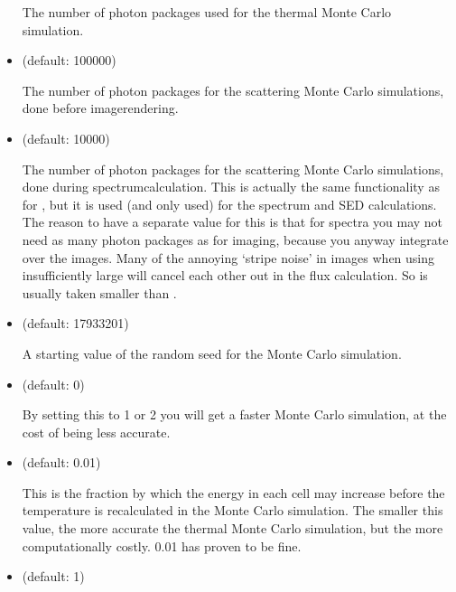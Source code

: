 \documentclass[letterpaper,10pt,english]{sphinxmanual}
\begin{document}
\begin{itemize}
The number of photon packages used for the thermal Monte Carlo simulation.

\item {} 
 (default: 100000)

The number of photon packages for the scattering Monte Carlo simulations,
done before image\sphinxhyphen{}rendering.

\item {} 
 (default: 10000)

The number of photon packages for the scattering Monte Carlo simulations, done
during spectrum\sphinxhyphen{}calculation. This is actually the same functionality as for
, but it is used (and only used) for the spectrum and SED
calculations. The reason to have a separate value for this is that for spectra
you may not need as many photon packages as for imaging, because you anyway
integrate over the images. Many of the annoying ‘stripe noise’ in images when
using insufficiently large  will cancel each other out in the
flux calculation. So  is usually taken smaller than
.

\item {} 
 (default: \sphinxhyphen{}17933201) 

A starting value of the random seed for the Monte Carlo simulation.

\item {} 
 (default: 0) 

By setting this to 1 or 2 you will get a faster Monte Carlo simulation,
at the cost of being less accurate.

\item {} 
 (default: 0.01) 

This is the fraction by which the energy in each cell may increase
before the temperature is recalculated in the Monte Carlo simulation.
The smaller this value, the more accurate the thermal Monte Carlo
simulation, but the more computationally costly. 0.01 has proven to be
fine.

\item {} 
 (default: 1)


\end{itemize}
\end{document}
